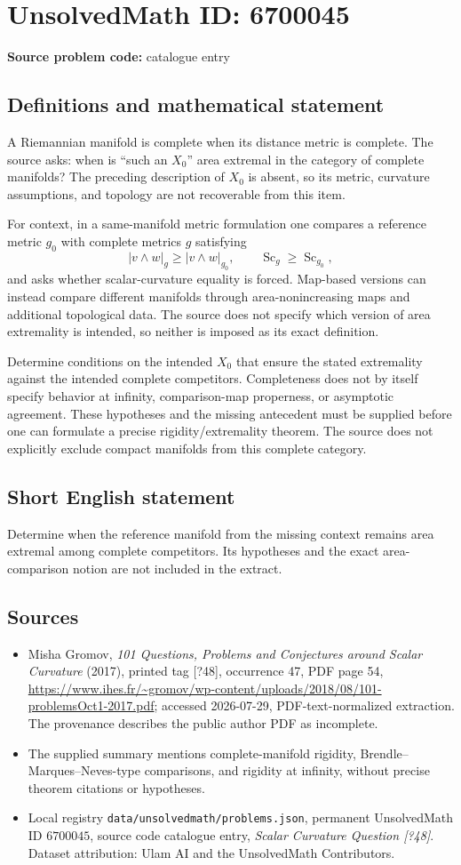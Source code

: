 \documentclass[11pt]{article}
\begin{document}
\section*{UnsolvedMath ID: 6700045}
\textbf{Source problem code:} catalogue entry
\subsection{Definitions and mathematical statement}
A Riemannian manifold is complete when its distance metric is complete. The source asks: when is ``such an $X_0$'' area extremal in the category of complete manifolds? The preceding description of $X_0$ is absent, so its metric, curvature assumptions, and topology are not recoverable from this item.

For context, in a same-manifold metric formulation one compares a reference metric $g_0$ with complete metrics $g$ satisfying
\[
|v\wedge w|_g\geq|v\wedge w|_{g_0},\qquad
\operatorname{Sc}_g\geq\operatorname{Sc}_{g_0},
\]
and asks whether scalar-curvature equality is forced. Map-based versions can instead compare different manifolds through area-nonincreasing maps and additional topological data. The source does not specify which version of area extremality is intended, so neither is imposed as its exact definition.

Determine conditions on the intended $X_0$ that ensure the stated extremality against the intended complete competitors. Completeness does not by itself specify behavior at infinity, comparison-map properness, or asymptotic agreement. These hypotheses and the missing antecedent must be supplied before one can formulate a precise rigidity/extremality theorem. The source does not explicitly exclude compact manifolds from this complete category.
\subsection{Short English statement}
Determine when the reference manifold from the missing context remains area extremal among complete competitors. Its hypotheses and the exact area-comparison notion are not included in the extract.
\subsection{Sources}
\begin{itemize}
\item Misha Gromov, \emph{101 Questions, Problems and Conjectures around Scalar Curvature} (2017), printed tag [?48], occurrence 47, PDF page 54, \url{https://www.ihes.fr/~gromov/wp-content/uploads/2018/08/101-problemsOct1-2017.pdf}; accessed 2026-07-29, PDF-text-normalized extraction. The provenance describes the public author PDF as incomplete.
\item The supplied summary mentions complete-manifold rigidity, Brendle--Marques--Neves-type comparisons, and rigidity at infinity, without precise theorem citations or hypotheses.
\item Local registry \texttt{data/unsolvedmath/problems.json}, permanent UnsolvedMath ID $6700045$, source code catalogue entry, \emph{Scalar Curvature Question [?48]}. Dataset attribution: Ulam AI and the UnsolvedMath Contributors.
\end{itemize}
\end{document}

